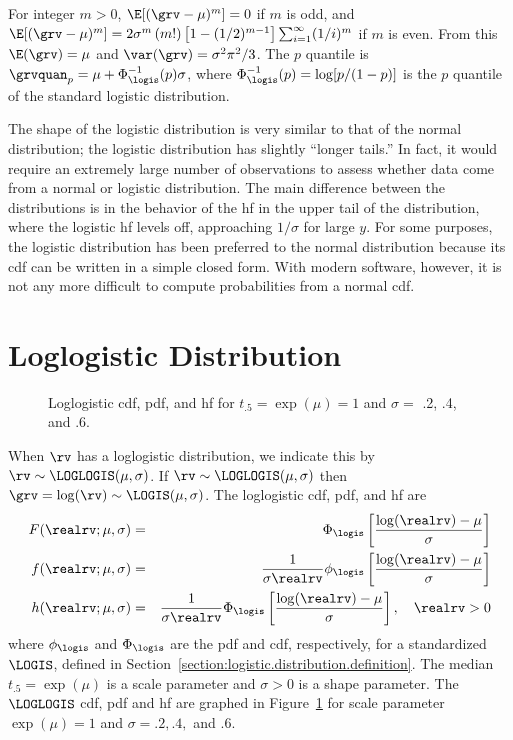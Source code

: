 For integer $m > 0$, $\E[(\grv-\mu)^{m}]=0$ if $m$ is odd, and
$\E[(\grv-\mu)^{m}]=2\sigma^{m}\, (m!)  		 \left [1-(1/2)^{m-1}
\right ] \sum_{i=1}^{\infty} (1/i)^{m}$ if $m$ is even. From this  
$\E(\grv)= \mu$ and $\var(\grv)= \sigma^{2} \pi^{2}/3$.
The $p$ quantile is
$\grvquan_{p}=\mu + \Phi^{-1}_{\logis} (p)\sigma $, where
$\Phi^{-1}_{\logis}(p)=\log[p/(1-p)]$ is the $p$ quantile of the
standard logistic distribution.

The shape of the logistic distribution is very similar to that of the
normal distribution; the logistic distribution has slightly ``longer
tails.'' In fact, it would require an extremely large number of
observations to assess whether data come from a normal or logistic 
distribution. The main difference between the distributions is in the
behavior of the hf in the upper tail of the
distribution, where the logistic hf levels off, approaching
$1/\sigma$ for large $y$.  For some purposes, the logistic
distribution has been preferred to the normal distribution because its
cdf can be written in a simple closed form.  With modern
software, however, it is not any more difficult to compute
probabilities from a normal cdf.



\section{Loglogistic Distribution}
\label{section:loglogistic.distribution.definition}
\begin{figure}
\caption{Loglogistic cdf, pdf, and hf for
$t_{.5}=\exp(\mu)=1$ and $\sigma=$ .2, .4, and .6.}
\label{figure:distplot.loglogis.ps}
\end{figure}
When $\rv$ has a loglogistic distribution, we indicate this by
$\rv \sim \LOGLOGIS(\mu,\sigma)$.  If $\rv \sim \LOGLOGIS(\mu,\sigma)$
then $\grv=\log(\rv) \sim \LOGIS(\mu, \sigma)$.  The loglogistic cdf,
pdf, and hf are
\begin{eqnarray*}  
 F(\realrv;\mu, \sigma)&=&\Phi_{\logis}\left [\frac{\log(\realrv)-\mu}{\sigma}
\right ]\\
 f(\realrv;\mu, \sigma)&=&\frac{1}{ \sigma \realrv} \phi_{\logis}
\left [ 
\frac{\log(\realrv)-\mu}{\sigma} \right] \\
h(\realrv;\mu, \sigma)&=& \frac{1}{ \sigma \realrv} \Phi_{\logis}
\left [ 
\frac{\log(\realrv)-\mu}{\sigma} \right], \quad \realrv > 0
 \end{eqnarray*} 
where $\phi_{\logis}$ and $\Phi_{\logis}$
are the pdf and cdf, respectively, for a standardized 
$\LOGIS$, defined in Section~\ref{section:logistic.distribution.definition}. 
The median $t_{.5}=
\exp(\mu)$ is a scale parameter and $\sigma > 0$ is a shape
parameter.  The $\LOGLOGIS$ cdf, pdf and hf
are graphed in
Figure~\ref{figure:distplot.loglogis.ps} for scale parameter
$\exp(\mu)=1$ and $\sigma=.2,.4,$ and $.6$.

